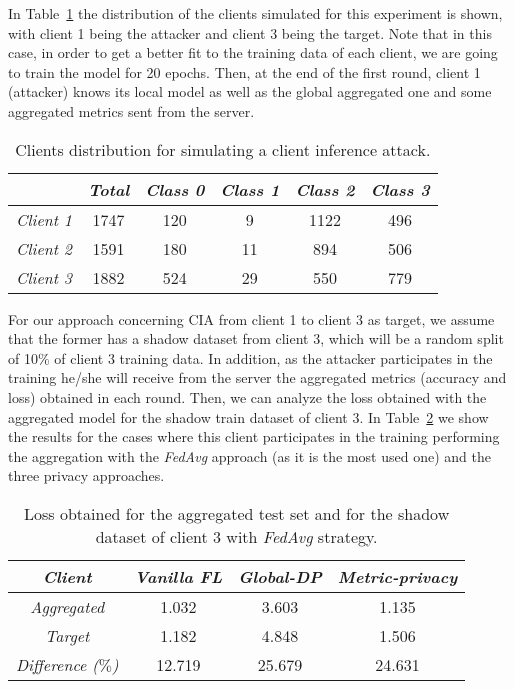 \documentclass[5p,times]{elsarticle}
\begin{document}
In Table~\ref{tab:distribution_ciattack} the distribution of the clients simulated for this experiment is shown, with client 1 being the attacker and client 3 being the target. Note that in this case, in order to get a better fit to the training data of each client, we are going to train the model for 20 epochs. Then, at the end of the first round, client 1 (attacker) knows its local model as well as the global aggregated one and some aggregated metrics sent from the server. 

\begin{table}[ht]
    \centering
    \begin{tabular}{cccccc}
    \toprule
         & \textit{\textbf{Total}} & \textit{\textbf{Class 0}} & \textit{\textbf{Class 1}} & \textit{\textbf{Class 2}} & \textit{\textbf{Class 3}} \\
         \midrule
         \textit{Client 1} & 1747 & 120 & 9 & 1122 & 496 \\ 
         \textit{Client 2} & 1591 & 180 & 11 & 894 & 506 \\ 
         \textit{Client 3} & 1882 & 524 & 29 & 550 & 779 \\ 
    \bottomrule
    \end{tabular}
    \caption{Clients distribution for simulating a client inference attack.}
    \label{tab:distribution_ciattack}
\end{table}

For our approach concerning CIA from client 1 to client 3 as target, we assume that the former has a shadow dataset from client 3, which will be a random split of 10$\%$ of client 3 training data. In addition, as the attacker participates in the training he/she will receive from the server the aggregated metrics (accuracy and loss) obtained in each round. Then, we can analyze the loss obtained with the aggregated model for the shadow train dataset of client 3. In Table~\ref{tab:ciattacks_example} we show the results for the cases where this client participates in the training performing the aggregation with the \textit{FedAvg} approach (as it is the most used one) and the three privacy approaches.

\begin{table}[ht]
    \centering
    \begin{tabular}{cccc}
    \toprule
         \textit{\textbf{Client}} & \textit{\textbf{Vanilla FL}} & \textit{\textbf{Global-DP}} & \textit{\textbf{Metric-privacy}} \\
         \midrule
         \textit{Aggregated} & 1.032 & 3.603 & 1.135 \\ 
         \textit{Target}  & 1.182 & 4.848 & 1.506 \\ 
         \midrule
         \textit{Difference ($\%$)} & 12.719  & 25.679  & 24.631 \\
    \bottomrule
    \end{tabular}
    \caption{Loss obtained for the aggregated test set and for the shadow dataset of client 3 with \textit{FedAvg} strategy.}
    \label{tab:ciattacks_example}
\end{table}
\end{document}
